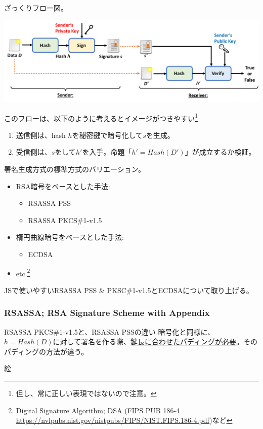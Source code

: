 \documentclass[12pt,dvipdfmx]{beamer}
\begin{document}
\begin{frame}
ざっくりフロー図。
\begin{center}
\includegraphics[width=0.9\linewidth]{Figs/sig-flow02.pdf}
\end{center}
このフローは、以下のように考えるとイメージがつきやすい\footnote[frame]{\scriptsize 但し、常に正しい表現ではないので注意。}
\begin{enumerate}
 \item 送信側は、hash $h$を\alert{秘密鍵で暗号化}して$s$を生成。
 \item 受信側は、$s$をして$h'$を入手。命題「$h' = \mathit{Hash}(D')$」が成立するか検証。
\end{enumerate}
\end{frame}

\begin{frame}
署名生成方式の標準方式のバリエーション。
\begin{itemize}
\item RSA暗号をベースとした手法:
\begin{itemize}
 \item RSASSA PSS
 \item RSASSA PKCS\#1-v1.5
\end{itemize}
\item 楕円曲線暗号をベースとした手法:
\begin{itemize}
 \item ECDSA
\end{itemize}
\item etc.\footnote[frame]{\scriptsize Digital Signature Algorithm; DSA (FIPS PUB 186-4 \url{https://nvlpubs.nist.gov/nistpubs/FIPS/NIST.FIPS.186-4.pdf})など}
\end{itemize}
JSで使いやすいRSASSA PSS \& PKSC\#1-v1.5とECDSAについて取り上げる。
\end{frame}


\begin{frame}
\frametitle{RSASSA; RSA Signature Scheme with Appendix}
\begin{block}{\small RSASSA PKCS\#1-v1.5と、RSASSA PSSの違い}
暗号化と同様に、$h=\mathit{Hash}(D)$に対して署名を作る際、\underline{鍵長に合わせたパディングが必要}。そのパディングの方法が違う。
\end{block}

\alert{絵}

\end{frame}
\end{document}
